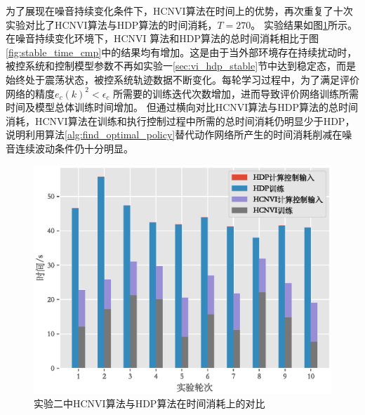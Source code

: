为了展现在噪音持续变化条件下，HCNVI算法在时间上的优势，再次重复了十次实验对比了HCNVI算法与HDP算法的时间消耗，$T=270$。
实验结果如图\ref{fig:noise_time_cmp}所示。在噪音持续变化环境下，HCNVI
算法和HDP算法的总时间消耗相比于图\ref{fig:stable_time_cmp}中的结果均有增加。这是由于当外部环境存在持续扰动时，被控系统和控制模型参数不再如实验一\ref{sec:vi_hdp_stable}节中达到稳定态，而是始终处于震荡状态，被控系统轨迹数据不断变化。每轮学习过程中，为了满足评价网络的精度$e_{c}(k)^{2}<\epsilon_{c}$
所需要的训练迭代次数增加，进而导致评价网络训练所需时间及模型总体训练时间增加。
但通过横向对比HCNVI算法与HDP算法的总时间消耗，HCNVI算法在训练和执行控制过程中所需的总时间消耗仍明显少于HDP，说明利用算法\ref{alg:find_optimal_policy}替代动作网络所产生的时间消耗削减在噪音连续波动条件仍十分明显。


\begin{figure}[htb]
    \centering
    \includegraphics[width=0.9\linewidth]{figures/chapter6/fig13.eps}
    \caption{实验二中HCNVI算法与HDP算法在时间消耗上的对比}
  \addtocounter{figure}{-1}
  \vspace{-5pt}
  \renewcommand{\figurename}{图}

    \label{fig:noise_time_cmp}
\end{figure}
